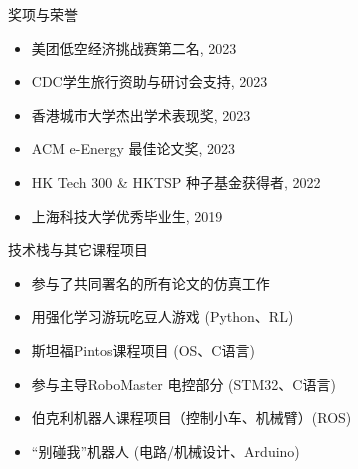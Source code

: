 \documentclass{resume} %
\begin{document}
\begin{rSection}{奖项与荣誉}

    \begin{multicols}{2} 
    \begin{itemize}
        \item 美团低空经济挑战赛第二名, 2023
        \item CDC学生旅行资助与研讨会支持, 2023
        \item 香港城市大学杰出学术表现奖, 2023
        \item ACM e-Energy 最佳论文奖, 2023
        \item HK Tech 300 \& HKTSP 种子基金获得者, 2022
        \item 上海科技大学优秀毕业生, 2019
    \end{itemize}
    \end{multicols}  %
    \vspace{-5mm}
\end{rSection}

\begin{rSection}{技术栈与其它课程项目}
    \begin{multicols}{2} 
    \begin{itemize}
        \item 参与了共同署名的{所有论文}的仿真工作
        \item 用强化学习游玩吃豆人游戏 (Python、RL) 
        \item 斯坦福Pintos课程项目 (OS、C语言)
        \item 参与主导RoboMaster 电控部分 (STM32、C语言)
        \item 伯克利机器人课程项目（控制小车、机械臂）(ROS) %
        \item ``别碰我''机器人 (电路/机械设计、Arduino)
    \end{itemize}
    \end{multicols}  %
    \vspace{-5mm}
\end{rSection}
\end{document}
